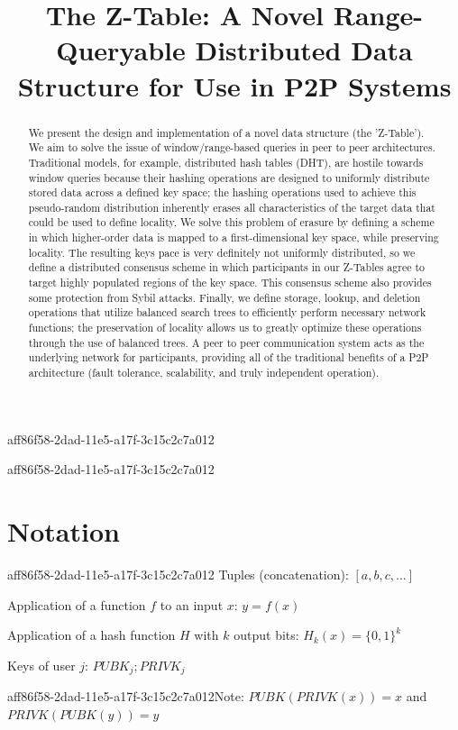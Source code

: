 \documentclass[12pt]{article}
\title{The Z-Table: A Novel Range-Queryable Distributed Data Structure for Use in P2P Systems}
\begin{document}
aff86f58-2dad-11e5-a17f-3c15c2c7a012\maketitle

\begin{abstract}
We present the design and implementation of a novel data structure (the 'Z-Table'). We aim to solve the issue of window/range-based queries in peer to peer architectures. Traditional models, for example,  distributed hash tables (DHT), are hostile towards window queries because their hashing operations are designed to uniformly distribute stored data across a defined key space; the hashing operations used to achieve this pseudo-random distribution inherently erases all characteristics of the target data that could be used to define locality. We solve this problem of erasure by defining a scheme in which higher-order data is mapped to a first-dimensional key space, while preserving locality. The resulting keys pace is very definitely not uniformly distributed, so we define a distributed consensus scheme in which participants in our Z-Tables agree to target highly populated regions of the key space. This consensus scheme also provides some protection from Sybil attacks. Finally, we define storage, lookup, and deletion operations that utilize balanced search trees to efficiently perform necessary network functions; the preservation of locality allows us to greatly optimize these operations through the use of balanced trees. A peer to peer communication system acts as the underlying network for participants, providing all of the traditional benefits of a P2P architecture (fault tolerance, scalability, and truly independent operation).
\end{abstract}

aff86f58-2dad-11e5-a17f-3c15c2c7a012\section{Notation}
aff86f58-2dad-11e5-a17f-3c15c2c7a012
Tuples (concatenation): $[a,b,c,...]$

Application of a function $f$ to an input $x$: $y=f(x)$

Application of a hash function $H$ with $k$ output bits: $H_{k}(x) = \{0,1\}^k$

Keys of user $j$: $ PUBK_j; PRIVK_j $

aff86f58-2dad-11e5-a17f-3c15c2c7a012Note: $PUBK(PRIVK(x)) = x$ and $PRIVK(PUBK(y)) = y$~
\end{document}
